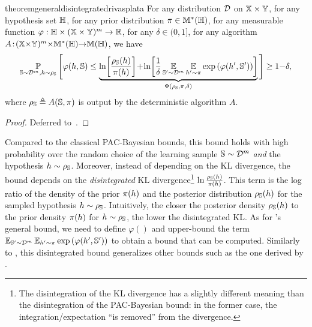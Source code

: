 \begin{restatable}{theorem}{generaldisintegratedrivasplata}\label{chap:pac-bayes:theorem:general-disintegrated-rivasplata}
For any distribution $\mathcal{D}$ on $\mathbb{X}\times\mathbb{Y}$, for any hypothesis set $\mathbb{H}$, for any prior distribution $\pi\in\mathbb{M}^{*}(\mathbb{H})$, for any measurable function $\varphi: \mathbb{H}\times(\mathbb{X}\times\mathbb{Y})^m\to \mathbb{R}$, for any $\delta\in(0, 1]$, for any algorithm \mbox{$A\!:\!(\mathbb{X}{\times}\mathbb{Y})^{m}{\times}\mathbb{M}^{*}(\mathbb{H}){\to} \mathbb{M}(\mathbb{H})$}, we have
\begin{align*}
\operatorname*{\mathbb{P}}_{\mathbb{S}\sim\mathcal{D}^m, h\sim\rho_{\mathbb{S}}}\Bigg[ \varphi(h,\mathbb{S}) \le \underbrace{\ln\!\left[\frac{\rho_{\mathbb{S}}(h)}{\pi(h)}\right]\!+\!\ln\!\left[\frac{1}{\delta}\operatorname*{\mathbb{E}}_{\mathbb{S}'\sim\mathcal{D}^m}\operatorname*{\mathbb{E}}_{h'\sim\pi}
\exp\left(\varphi(h',\mathbb{S}')\right)\right]}_{\Phi(\rho_{\mathbb{S}}, \pi, \delta)}
\Bigg] \ge 1{-}\delta,
\end{align*}
where $\rho_{\mathbb{S}} \triangleq A(\mathbb{S}, \pi)$ is output by the deterministic algorithm $A$.
\end{restatable}
\begin{noaddcontents}\begin{proof}
Deferred to~.
\end{proof}\end{noaddcontents}

Compared to the classical PAC-Bayesian bounds, this bound holds with high probability over the random choice of the learning sample $\mathbb{S}\sim\mathcal{D}^m$ {\it and} the hypothesis $h\sim\rho_{\mathbb{S}}$.
Moreover, instead of depending on the KL divergence, the bound depends on the {\it disintegrated} KL divergence\footnote{The disintegration of the KL divergence has a slightly different meaning than the disintegration of the PAC-Bayesian bound: in the former case, the integration/expectation ``is removed'' from the divergence.} $\ln\frac{\rho_{\mathbb{S}}(h)}{\pi(h)}$.
This term is the log ratio of the density of the prior $\pi(h)$ and the posterior distribution $\rho_{\mathbb{S}}(h)$ for the sampled hypothesis $h\sim\rho_{\mathbb{S}}$.
Intuitively, the closer the posterior density $\rho_{\mathbb{S}}(h)$ to the prior density $\pi(h)$ for $h\sim\rho_{\mathbb{S}}$, the lower the disintegrated KL.
As for \citet{GermainLacasseLavioletteMarchand2009}'s general bound, we need to define $\varphi()$ and upper-bound the term $\operatorname*{\mathbb{E}}_{\mathbb{S}'\sim\mathcal{D}^m}\operatorname*{\mathbb{E}}_{h'\sim\pi}
\exp\left(\varphi(h',\mathbb{S}')\right)$ to obtain a bound that can be computed.
Similarly to , this disintegrated bound generalizes other bounds such as the one derived by \citet[Theorem~1.2.7]{Catoni2007}.

